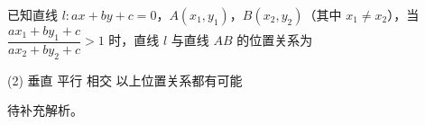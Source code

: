 \begin{choice}[source={浙江宁波镇海中学模拟}, topic={直线与位置关系}]
已知直线 $l: ax+by+c=0$，$A(x_1, y_1)$，$B(x_2, y_2)$（其中 $x_1 \ne x_2$），当 $\dfrac{ax_1+by_1+c}{ax_2+by_2+c} > 1$ 时，直线 $l$ 与直线 $AB$ 的位置关系为
\begin{tasks}(2)
	\task 垂直
	\task 平行
	\task 相交
	\task 以上位置关系都有可能
\end{tasks}
\end{choice}
\begin{choice-sol}
待补充解析。
\end{choice-sol}
